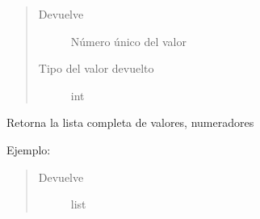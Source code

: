 \documentclass[a4paper,12pt,spanish]{sphinxmanual}
\begin{document}
\begin{fulllineitems}
\begin{fulllineitems}
\begin{quote}
\begin{description}
\item[{Devuelve}] \leavevmode
Número único del valor

\item[{Tipo del valor devuelto}] \leavevmode
int

\end{description}\end{quote}

\end{fulllineitems}


\begin{fulllineitems}
\label{\detokenize{openerm.Utils:openerm.Utils.AutoNum.list}}
Retorna la lista completa de valores, numeradores
\begin{description}
\item[{Ejemplo:}] \leavevmode
\begin{sphinxVerbatim}[commandchars=\\\{\}]
   
  
\end{sphinxVerbatim}

\end{description}
\begin{quote}\begin{description}
\item[{Devuelve}] \leavevmode
list

\end{description}\end{quote}

\end{fulllineitems}


\end{fulllineitems}
\end{document}
